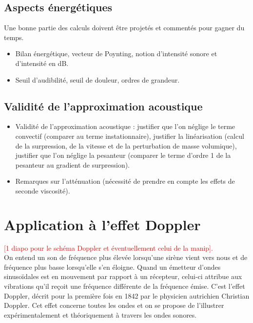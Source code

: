 \documentclass[11pt,a4paper]{report}
\begin{document}
\subsection{Aspects énergétiques}
Une bonne partie des calculs doivent être projetés et commentés pour gagner du temps.
\begin{itemize}
	\item Bilan énergétique, vecteur de Poynting, notion d'intensité sonore et d'intensité en dB.
	\item Seuil d'audibilité, seuil de douleur, ordres de grandeur.
\end{itemize}

\subsection{Validité de l'approximation acoustique}
\begin{itemize}
	\item Validité de l'approximation acoustique : justifier que l'on néglige le terme convectif (comparer au terme instationnaire), justifier la linéarisation (calcul de la surpression, de la vitesse et de la perturbation de masse volumique), justifier que l'on néglige la pesanteur (comparer le terme d'ordre 1 de la pesanteur au gradient de surpression).
	\item Remarques sur l'atténuation (nécessité de prendre en compte les effets de seconde viscosité).
\end{itemize}

\newpage
\section{Application à l'effet Doppler}\label{sec:3}
\textcolor{red}{[1 diapo pour le schéma Doppler et éventuellement celui de la manip].}\\

On entend un son de fréquence plus élevée lorsqu’une sirène vient vers nous et de fréquence plus basse lorsqu’elle s’en éloigne. Quand un émetteur d’ondes sinusoïdales est en mouvement par rapport à un récepteur, celui-ci attribue aux vibrations qu’il reçoit une fréquence différente de la fréquence émise. C’est l’effet Doppler, décrit pour la première fois en 1842 par le physicien autrichien Christian Doppler. Cet effet concerne toutes les ondes et on se propose de l'illustrer expérimentalement et théoriquement à travers les ondes sonores.\\
\end{document}
